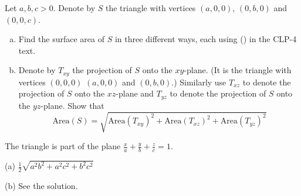 \begin{question}
Let $a,b,c > 0$. Denote by $S$ the triangle with vertices $(a,0,0)$,
$(0,b,0)$ and $(0,0,c)$.
\begin{enumerate}[(a)]
\item
Find the surface area of $S$ in three different ways, each using 
() in the CLP-4 text.
\item
Denote by $T_{xy}$ the projection of $S$ onto the $xy$-plane. (It is the 
triangle with vertices $(0,0,0)$ $(a,0,0)$ and $(0,b,0)$.) Similarly use
$T_{xz}$ to denote the projection of $S$ onto the $xz$-plane and
$T_{yz}$ to denote the projection of $S$ onto the $yz$-plane. Show that
\begin{equation*}
\text{Area}(S) =\sqrt{\text{Area}(T_{xy})^2
                     +\text{Area}(T_{xz})^2
                     +\text{Area}(T_{yz})^2
                     }
\end{equation*}

\end{enumerate}
\end{question}

\begin{hint} 
The triangle is part of the plane $\frac{x}{a}+\frac{y}{b} +\frac{z}{c}=1$.
\end{hint}

\begin{answer} 
(a) $\frac{1}{2}\sqrt{a^2b^2+a^2c^2+b^2c^2}$

(b) See the solution.
\end{answer}

